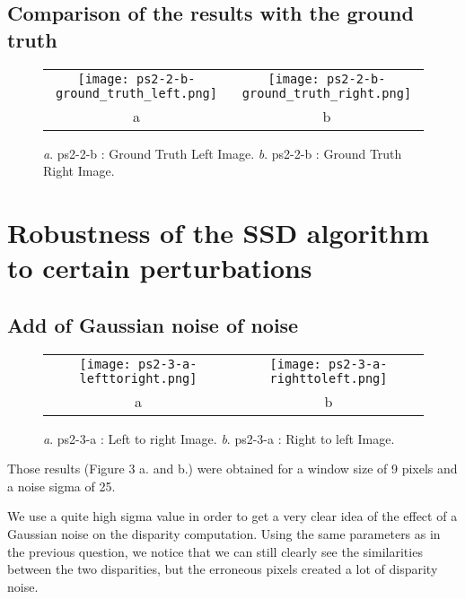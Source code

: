 \documentclass[a4paper,11pt]{article}
\begin{document}
\subsection{Comparison of the results with the ground truth}

 \begin{figure}[H]
\begin{center}
\begin{tabular}{cc}
	\texttt{[image: ps2-2-b-ground\_truth\_left.png]}&
	\texttt{[image: ps2-2-b-ground\_truth\_right.png]}\\
	a&b
\end{tabular}
\end{center}
\caption{ 
\textit{a}. ps2-2-b : Ground Truth Left Image.  \textit{b}.  ps2-2-b : Ground Truth Right Image. }
\label{ps2-1}
\end{figure}

\section{Robustness of the SSD algorithm to certain perturbations}

\subsection{Add of Gaussian noise of noise}


 \begin{figure}[H]
\begin{center}
\begin{tabular}{cc}
	\texttt{[image: ps2-3-a-lefttoright.png]}&
	\texttt{[image: ps2-3-a-righttoleft.png]}\\
	a&b
\end{tabular}
\end{center}
\caption{ 
\textit{a}. ps2-3-a : Left to right Image.  \textit{b}. ps2-3-a : Right to left Image. }
\label{ps2-1}
\end{figure}

Those results (Figure 3 a. and b.) were obtained for a window size of 9 pixels and a noise sigma of 25.

We use a quite high sigma value in order to get a very clear idea of the effect of a Gaussian noise on the disparity computation.
Using the same parameters as in the previous question, we notice that we can still clearly see the similarities between the two disparities, but the erroneous pixels created a lot of disparity noise.
\end{document}
